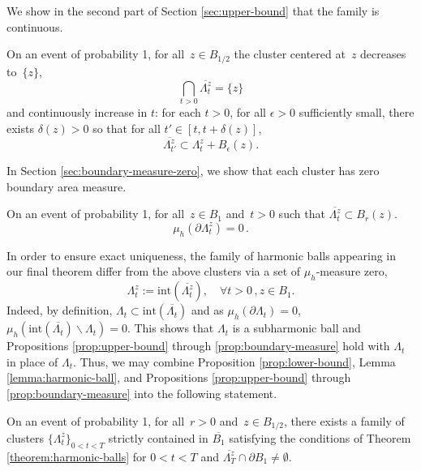 \documentclass[12pt]{amsart}
\numberwithin{equation}{section}
\newcommand{\cluster}[2]{\hyperref[eq:non-co-set]{\mathit{\Lambda}^{#1}_{#2}}}
\newcommand{\regcluster}[2]{\hyperref[eq:regular-cluster]{\Lambda^{#1}_{#2}}}
\begin{document}
	We show in the second part of Section \ref{sec:upper-bound} that the family is continuous. 
	\begin{prop} \label{prop:continuity}
		On an event of probability 1, for all~$z \in B_{1/2}$ the cluster centered at~$z$ decreases to~$\{z\}$,  
		\begin{equation} \label{eq:contains-origin}
		\bigcap_{t > 0} \overline{{{\cluster{z}{t}}}} = \{z\}
		\end{equation} 
		and continuously increase in $t$:  for each $t > 0$, for all $\epsilon > 0$ sufficiently small, there exists $\delta(z) > 0$ so that for all 
		$t' \in [t, t + \delta(z)]$, 
		\begin{equation} \label{eq:continuity}
		\overline{{\cluster{z}{t'}}} \subset {\cluster{z}{t}} + B_{\epsilon}(z).
		\end{equation}
	\end{prop}
	In Section \ref{sec:boundary-measure-zero}, we show that each cluster has zero boundary area measure.   
	\begin{prop} \label{prop:boundary-measure}
		On an event of probability 1,  for all~$z \in B_1$ and~$t > 0$ such that $\overline{{{\cluster{z}{t}}}} \subset B_r(z)$. 
		\begin{equation}
		\mu_h (\partial {\cluster{z}{t}}) = 0 \, . 
		\end{equation}
	\end{prop}
	
	
	In order to ensure exact uniqueness, the family of harmonic balls appearing in our final theorem differ from the above clusters
	via a set of $\mu_h$-measure zero, 
	\begin{equation} \label{eq:regular-cluster}
	{\regcluster{z}{t}} := \mathrm{int}(\overline{{{\cluster{z}{t}}}}), \quad \forall t >0 \, , z \in B_1.
	\end{equation}
	Indeed, by definition, ${\cluster{}{t}} \subset \mathrm{int}(\overline{{{\cluster{}{t}}}})$ and as $\mu_h(\partial {\cluster{}{t}}) = 0$, $\mu_h(\mathrm{int}(\overline{{{\cluster{}{t}}}}) \backslash {\cluster{}{t}}) = 0$. This shows that ${\regcluster{}{t}}$ is a subharmonic ball and Propositions \ref{prop:upper-bound} through \ref{prop:boundary-measure} 
	hold with ${\regcluster{}{t}}$ in place of ${\cluster{}{t}}$. Thus, we may combine Proposition \ref{prop:lower-bound}, Lemma \ref{lemma:harmonic-ball}, and Propositions \ref{prop:upper-bound} through \ref{prop:boundary-measure} into the following statement. 
	
	
	\begin{prop} \label{prop:conditional}
		On an event of probability 1, for all~$r > 0 $ and~$z \in B_{1/2}$, there exists a family of clusters $\{{\regcluster{z}{t}}\}_{0 < t < T}$ strictly contained in $\overline{B_1}$
		satisfying the conditions of Theorem \ref{theorem:harmonic-balls} for $0 < t<T$ and $\overline{{\regcluster{z}{T}}} \cap \partial B_1 \neq \emptyset$.
	\end{prop}
	
\end{document}
